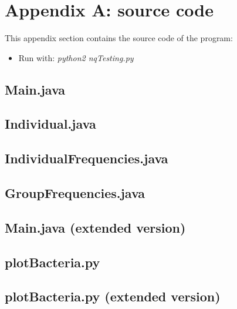 \documentclass[runningheads]{llncs}
\begin{document}
\section{Appendix A: source code}\label{appendix}
This appendix section contains the source code of the program:
\begin{itemize}
\item Run with: \textit{python2 nqTesting.py}
\end{itemize}

\subsection{Main.java}\label{main}


\subsection{Individual.java}\label{ind}


\subsection{IndividualFrequencies.java}\label{indfre}


\subsection{GroupFrequencies.java}\label{groupfre}


\subsection{Main.java (extended version)}\label{mainext}


\subsection{plotBacteria.py}\label{plot1}


\subsection{plotBacteria.py (extended version)}\label{plot1}


%
\end{document}
